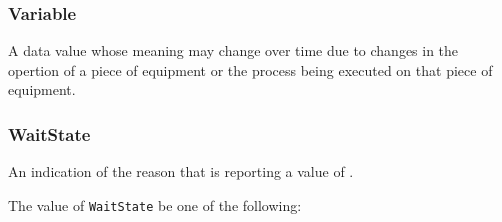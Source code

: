 \subsubsection{Variable}
\label{sec:Variable}



A data value whose meaning may change over time due to changes in the opertion of a piece of equipment or the process being executed on that piece of equipment.


\subsubsection{WaitState}
\label{sec:WaitState}



An indication of the reason that  is reporting a value of .


The value of \texttt{WaitState} \MUST be one of the following: 


